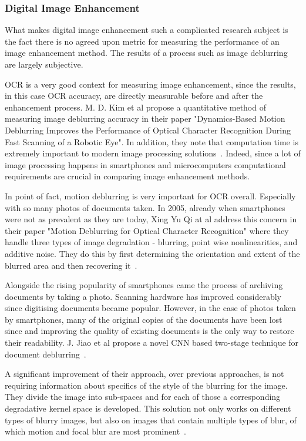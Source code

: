 \documentclass[12pt]{article}
\begin{document}
\subsubsection{Digital Image Enhancement}

What makes digital image enhancement such a complicated research subject is the fact there is no agreed upon metric for measuring the performance of an image enhancement method. The results of a process such as image deblurring are largely subjective.

OCR is a very good context for measuring image enhancement, since the results, in this case OCR accuracy, are directly measurable before and after the enhancement process. M. D. Kim et al propose a quantitative method of measuring image deblurring accuracy in their paper "Dynamics-Based Motion Deblurring Improves the Performance of Optical
Character Recognition During Fast Scanning of a Robotic Eye". In addition, they note that computation time is extremely important to modern image processing solutions~\cite{dynbmd}. Indeed, since a lot of image processing happens in smartphones and microcomputers computational requirements are crucial in comparing image enhancement methods.

In point of fact, motion deblurring is very important for OCR overall. Especially with so many photos of documents taken. In 2005, already when smartphones were not as prevalent as they are today, Xing Yu Qi at al address this concern in their paper "Motion Deblurring for Optical Character Recognition" where they handle three types of image degradation - blurring, point wise nonlinearities, and additive noise. They do this by first determining the orientation and extent of the blurred area and then recovering it~\cite{1575575}.

Alongside the rising popularity of smartphones came the process of archiving documents by taking a photo. Scanning hardware has improved considerably since digitising documents became popular. However, in the case of photos taken by smartphones, many of the original copies of the documents have been lost since and improving the quality of existing documents is the only way to restore their readability. J. Jiao et al propose a novel CNN based two-stage technique for document deblurring~\cite{8270051}.

A significant improvement of their approach, over previous approaches, is not requiring information about specifics of the style of the blurring for the image. They divide the image into sub-spaces and for each of those a corresponding degradative kernel space is developed. This solution not only works on different types of blurry images, but also on images that contain multiple types of blur, of which motion and focal blur are most prominent~\cite{8270051}.
\end{document}
